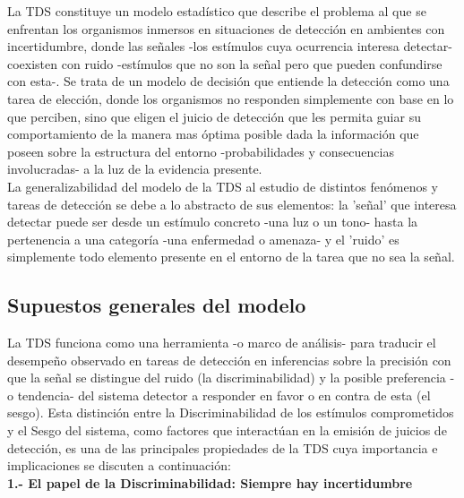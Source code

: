 La TDS constituye un modelo estadístico que describe el problema al que se enfrentan los organismos inmersos en situaciones de detección en ambientes con incertidumbre, donde las señales -los estímulos cuya ocurrencia interesa detectar- coexisten con ruido -estímulos que no son la señal pero que pueden confundirse con esta-. Se trata de un modelo de decisión que entiende la detección como una tarea de elección, donde los organismos no responden simplemente con base en lo que perciben, sino que eligen el juicio de detección que les permita guiar su comportamiento de la manera mas óptima posible dada la información que poseen sobre la estructura del entorno -probabilidades y consecuencias involucradas- a la luz de la evidencia presente.\\

La generalizabilidad del modelo de la TDS al estudio de distintos fenómenos y tareas de detección se debe a lo abstracto de sus elementos: la 'señal' que interesa detectar puede ser desde un estímulo concreto -una luz o un tono- hasta la pertenencia a una categoría -una enfermedad o amenaza- y el 'ruido' es simplemente todo elemento presente en el entorno de la tarea que no sea la señal.\\ 

\subsection{Supuestos generales del modelo}

La TDS funciona como una herramienta -o marco de análisis- para traducir el desempeño observado en tareas de detección en inferencias sobre la precisión con que la señal se distingue del ruido (la discriminabilidad) y la posible preferencia -o tendencia- del sistema detector a responder en favor o en contra de esta (el sesgo). Esta distinción entre la Discriminabilidad de los estímulos comprometidos y el Sesgo del sistema, como factores que interactúan en la emisión de juicios de detección, es una de las principales propiedades de la TDS cuya importancia e implicaciones se discuten a continuación:\\

\textbf{1.- El papel de la Discriminabilidad: Siempre hay incertidumbre}\\

